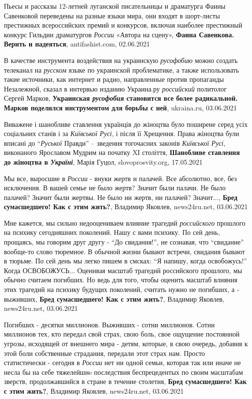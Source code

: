 Пьесы и рассказы 12-летней луганской писательницы и драматурга Фаины Савенковой
переведены на разные языки мира, они входят в шорт-листы престижных
всероссийских премий и конкурсов, включая наиболее престижный конкурс Гильдии
драматургов \emph{России} «Автора на сцену»,
\textbf{Фаина Савенкова. Верить и надеяться}, antifashist.com, 02.06.2021

В качестве инструмента воздействия на украинскую \emph{русофобию} можно создать
телеканал на \emph{русском} языке по украинской проблематике, а также
использовать такие источники, как интернет и радио, направленные против
пропаганды Незалежной, сказал в интервью изданию Украина.ру \emph{российский}
политолог Сергей Марков,
\textbf{Украинская \emph{русофобия} становится все более радикальной. Марков поделился инструментом для борьбы с ней},
ukraina.ru, 03.06.2021

Виважене і шанобливе ставлення українців до жіноцтва було поширене серед усіх
соціальних станів і за \emph{Київської Русі}, і після її Хрещення. Права жіноцтва
були вписані до \enquote{\emph{Руської} Правди} – зведення тогочасних законів
\emph{Київської Русі}, виконаного Ярославом Мудрим на початку XІ століття,
\textbf{Шанобливе ставлення до жіноцтва в \emph{Україні}},
Марія Гуцол, slovoprosvity.org, 17.05.2021

Мы все, выросшие в \emph{России} - внуки жертв и палачей. Все абсолютно, все, без
исключения. В вашей семье не было жертв? Значит были палачи. Не было палачей?
Значит были жертвы. Не было ни жертв, ни палачей? Значит...,
\textbf{Бред сумасшедшего! Как с этим жить?}, Владимир Яковлев, news24ru.net, 03.06.2021

Мне кажется, мы сильно недооцениваем влияние трагедий \emph{российского} прошлого на
психику сегодняшних поколений. Нашу с вами психику. По сей день, прощаясь, мы
говорим друг другу - \enquote{До свидания!}, не сознавая, что
\enquote{свидание} вообще-то слово тюремное. В обычной жизни бывают встречи,
свидания бывают в тюрьме.  По сей день мы легко пишем в смсках: \enquote{Я
напишу, когда освобожусь!} Когда ОСВОБОЖУСЬ...  Оценивая масштаб трагедий
российского прошлого, мы обычно считаем погибших. Но ведь для того, чтобы
оценить масштаб влияния этих трагедий на психику будущих поколений, считать
нужно не погибших, а - выживших,
\textbf{Бред сумасшедшего! Как с этим жить?}, Владимир Яковлев, news24ru.net, 03.06.2021

Погибших - десятки миллионов. Выживших - сотни миллионов. Сотни миллионов тех,
кто передал свой страх, свою боль, свое ощущение постоянной угрозы, исходящей
от внешнего мира - детям, которые, в свою очередь, добавив к этой боли
собственные страдания, передали этот страх нам. Просто статистически - сегодня
в \emph{России} нет ни одной семьи, которая так или иначе не несла бы на себе
тяжелейшиe последствия беспрецедентых по своим масштабам зверств,
продолжавшийся в стране в течение столетия,
\textbf{Бред сумасшедшего! Как с этим жить?}, Владимир Яковлев, news24ru.net, 03.06.2021

